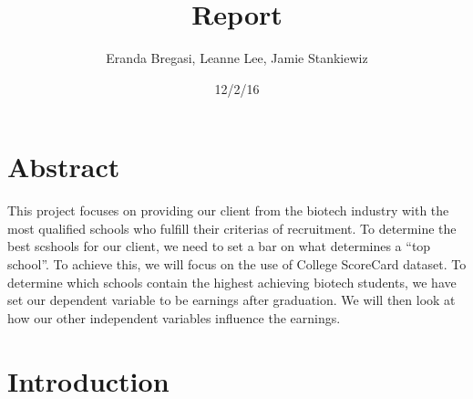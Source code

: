 \documentclass{article}
\begin{document}
\title{Report}
\author{Eranda Bregasi, Leanne Lee, Jamie Stankiewiz}
\date{12/2/16}
\maketitle






\section{Abstract}

  This project focuses on providing our client from the biotech industry with the most qualified schools who fulfill their criterias of recruitment.  To determine the best scshools for our client, we need to set a bar on what determines a ``top school''.  To achieve this, we will focus on the use of College ScoreCard dataset.  To determine which schools contain the highest achieving biotech students, we have set our dependent variable to be earnings after graduation.  We will then look at how our other independent variables influence the earnings. 

\section{Introduction}
\end{document}
